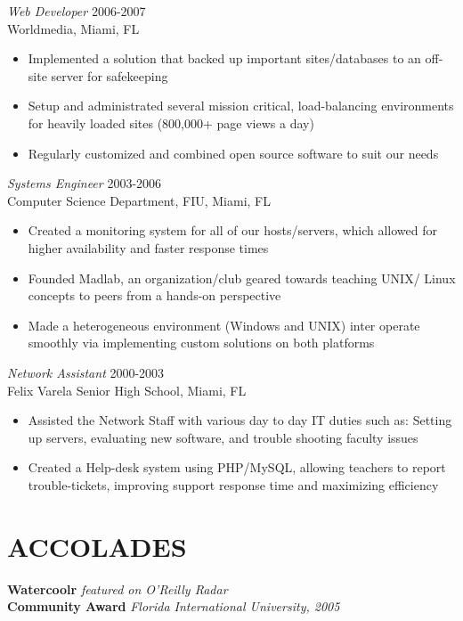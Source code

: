 \documentclass[margin]{res}
\begin{document}
\begin{resume}
  {\sl Web Developer} \hfill 2006-2007 \\
  Worldmedia, Miami, FL
  \begin{itemize}  \itemsep -2pt %
  \item Implemented a solution that backed up important sites/databases
    to an off-site server for safekeeping
  \item Setup and administrated several mission critical, load-balancing
    environments for heavily loaded sites (800,000+ page views a day)
  \item Regularly customized and combined open source software to suit our needs
  \end{itemize}
  
  {\sl Systems Engineer} \hfill            2003-2006 \\
  Computer Science Department, FIU, Miami, FL
  \begin{itemize}  \itemsep -2pt %
  \item Created a monitoring system for all of our hosts/servers, which allowed
    for higher availability and faster response times
  \item Founded Madlab, an organization/club geared towards teaching UNIX/
    Linux concepts to peers from a hands-on perspective
  \item Made a heterogeneous environment (Windows and UNIX) inter
    operate smoothly via implementing custom solutions on both platforms
  \end{itemize} 
  
  {\sl Network Assistant} \hfill        2000-2003 \\
  Felix Varela Senior High School, Miami, FL
  \begin{itemize}  \itemsep -2pt %
  \item Assisted the Network Staff with various day to day IT duties such as:
    Setting up servers, evaluating new software, and trouble shooting faculty issues
  \item Created a Help-desk system using PHP/MySQL, allowing teachers to
    report trouble-tickets, improving support response time and maximizing
    efficiency
    \end{itemize} 

  \section{ACCOLADES}
  {\bf Watercoolr }{\it featured on O'Reilly Radar} \\
  {\bf Community Award }{\it Florida International University, 2005}

 \end{resume}
\end{document}
